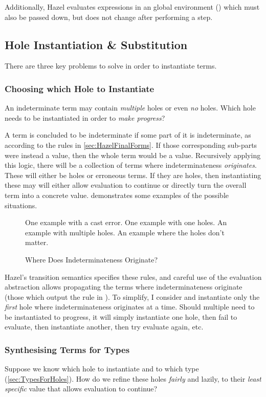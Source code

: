 Additionally, Hazel evaluates expressions in an global environment () which must also be passed down, but does not change after performing a step.

\subsection{Hole Instantiation \& Substitution}\label{sec:HoleInstantiation}
There are three key problems to solve in order to instantiate terms.

\subsubsection{Choosing which Hole to Instantiate}
\label{sec:ChooseHole}
An indeterminate term may contain \textit{multiple} holes or even \textit{no} holes. Which hole needs to be instantiated in order to \textit{make progress}?

A term is concluded to be indeterminate if some part of it is indeterminate, as according to the rules in \ref{sec:HazelFinalForms}. If those corresponding sub-parts were instead a value, then the whole term would be a value. Recursively applying this logic, there will be a collection of terms where indeterminateness \textit{originates}. These will either be holes or erroneous terms. If they are holes, then instantiating these may will either allow evaluation to continue or directly turn the overall term into a concrete value.  demonstrates some examples of the possible situations.

\begin{figure}
One example with a cast error. One example with one holes. An example with multiple holes. An example where the holes don't matter.
\caption{Where Does Indeterminateness Originate?}
\label{fig:IndetOrigination}
\end{figure}

Hazel's transition semantics specifies these rules, and careful use of the evaluation abstraction allows propagating the terms where indeterminateness originate (those which output the rule  in ). To simplify, I consider and instantiate only the \textit{first} hole where indeterminateness originates at a time. Should multiple need to be instantiated to progress, it will simply instantiate one hole, then fail to evaluate, then instantiate another, then try evaluate again, etc.

\subsubsection{Synthesising Terms for Types}
Suppose we know which hole to instantiate and to which type (\cref{sec:TypesForHoles}). How do we refine these holes \textit{fairly} and lazily, to their \textit{least specific} value that allows evaluation to continue?

